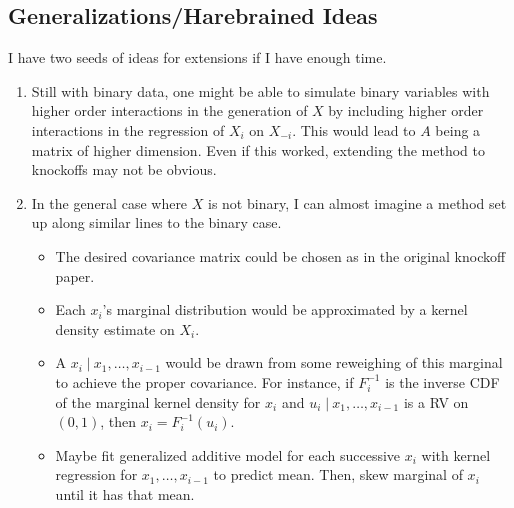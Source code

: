 \documentclass[11pt]{article}
\newcommand{\st}{ \; \big | \:}
\theoremstyle{definition}
\begin{document}
\subsection{Generalizations/Harebrained Ideas}
I have two seeds of ideas for extensions if I have enough time.
\begin{enumerate}
    \item Still with binary data, one might be able to simulate binary variables with higher order interactions in the generation of $X$ by including higher order interactions in the regression of $X_i$ on $X_{-i}$. This would lead to $A$ being a matrix of higher dimension. Even if this worked, extending the method to knockoffs may not be obvious.
    \item In the general case where $X$ is not binary, I can almost imagine a method set up along similar lines to the binary case.
    \begin{itemize}
        \item The desired covariance matrix could be chosen as in the original knockoff paper.
        \item Each $x_i$'s marginal distribution would be approximated by a kernel density estimate on $X_i$.
        \item A $x_i \st x_1, \ldots, x_{i-1}$ would be drawn from some reweighing of this marginal to achieve the proper covariance. For instance, if $F_i^{-1}$ is the inverse CDF of the marginal kernel density for $x_i$ and $u_i\st x_1, \ldots, x_{i-1}$ is a RV on $(0,1)$, then $x_i=F_i^{-1}(u_i)$.
        \item Maybe fit generalized additive model for each successive $x_i$ with kernel regression for $x_1,\ldots,x_{i-1}$ to predict mean. Then, skew marginal of $x_i$ until it has that mean. 
    \end{itemize}
\end{enumerate}



    
\end{document}
